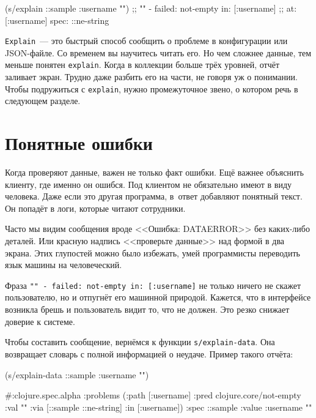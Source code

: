 \begin{english}
  \begin{clojure}
(s/explain ::sample {:username ""})
;; "" - failed: not-empty in: [:username]
;; at: [:username] spec: ::ne-string
  \end{clojure}
\end{english}

\verb|Explain|~--- это быстрый способ сообщить о проблеме в конфигурации или
JSON-файле. Со временем вы научитесь читать его. Но чем сложнее данные, тем
меньше понятен \verb|explain|. Когда в коллекции больше трёх уровней,
отчёт заливает экран. Трудно даже разбить его на части, не говоря уж о
понимании. Чтобы подружиться с \verb|explain|, нужно промежуточное звено, о
котором речь в следующем разделе.

\section{Понятные ошибки}


\label{spec-messages}

Когда проверяют данные, важен не только факт ошибки. Ещё важнее объяснить
клиенту, где именно он ошибся. Под клиентом не обязательно имеют в виду
человека. Даже если это другая программа, в~ответ добавляют понятный текст. Он
попадёт в логи, которые читают сотрудники.

Часто мы видим сообщения вроде <<Ошибка: DATAERROR>> без каких-либо деталей. Или
красную надпись <<проверьте данные>> над формой в два экрана. Этих глупостей
можно было избежать, умей программисты переводить язык машины на человеческий.


Фраза \texttt{"" - failed: not-empty in: [:user\-name]} не только ничего не скажет
пользователю, но и отпугнёт его машинной природой. Кажется, что в интерфейсе
возникла брешь и пользователь видит то, что не должен. Это резко снижает
доверие к системе.

Чтобы составить сообщение, вернёмся к функции \verb|s/explain-data|. Она
возвращает словарь с полной информацией о неудаче. Пример такого отчёта:

\begin{english}
  \begin{clojure}
(s/explain-data ::sample {:username ""})

#:clojure.spec.alpha
{:problems
 ({:path [:username]
   :pred clojure.core/not-empty
   :val ""
   :via [::sample ::ne-string]
   :in [:username]})
 :spec ::sample
 :value {:username ""}}
  \end{clojure}
\end{english}

